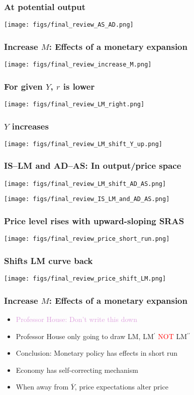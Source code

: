 \documentclass[presentation,dvipsnames]{beamer}
\begin{document}
\begin{frame}
\frametitle{At potential output}
\centerline{\texttt{[image: figs/final\_review\_AS\_AD.png]}}
\end{frame}

\begin{frame}
\frametitle{Increase $M$: Effects of a monetary expansion}
\centerline{\texttt{[image: figs/final\_review\_increase\_M.png]}}
\end{frame}

\begin{frame}
\frametitle{For given $Y$, $r$ is lower}
\centerline{\texttt{[image: figs/final\_review\_LM\_right.png]}}
\end{frame}

\begin{frame}
\frametitle{$Y$ increases}
\centerline{\texttt{[image: figs/final\_review\_LM\_shift\_Y\_up.png]}}
\end{frame}

\begin{frame}
\frametitle{IS--LM and AD--AS: In output/price space}
\centerline{\texttt{[image: figs/final\_review\_LM\_shift\_AD\_AS.png]}}
\end{frame}

\begin{frame}
\centerline{\texttt{[image: figs/final\_review\_IS\_LM\_and\_AD\_AS.png]}}
\end{frame}

\begin{frame}
\frametitle{Price level rises with upward-sloping SRAS}
\centerline{\texttt{[image: figs/final\_review\_price\_short\_run.png]}}
\end{frame}

\begin{frame}
\frametitle{Shifts LM curve back}
\centerline{\texttt{[image: figs/final\_review\_price\_shift\_LM.png]}}
\end{frame}


\begin{frame}
\frametitle{Increase $M$: Effects of a monetary expansion}
\begin{itemize}[label={--}]
\item \textcolor{Plum}{Professor House: Don't write this down}
\item Professor House only going to draw LM, LM$^{\prime}$ \textcolor{red}{NOT} LM$^{\prime\prime}$
\item Conclusion: Monetary policy has effects in short run
\item Economy has self-correcting mechanism
\item When away from $\overline{Y}$, price expectations alter price
\end{itemize}
\end{frame}
\end{document}
